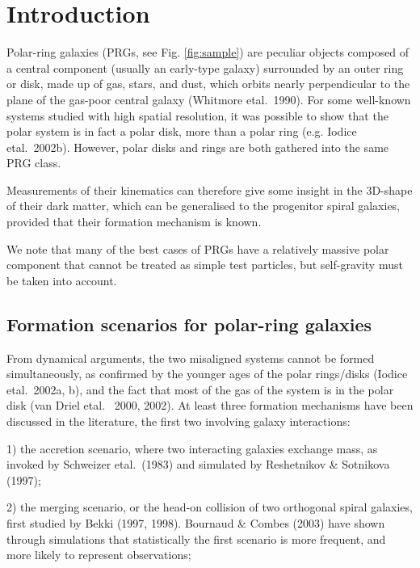 \documentclass[traditabstract]{aa}
\def\ts     {\thinspace}
\def\etal   {{\rm et\ts al.}~}
\begin{document}

\section{Introduction}

Polar-ring galaxies (PRGs, see Fig. \ref{fig:sample}) are peculiar objects composed of a
central component (usually an early-type galaxy) surrounded by
an outer ring or disk, made up of gas, stars, and dust, which
orbits nearly perpendicular to the plane of the gas-poor central
galaxy (Whitmore \etal 1990).
 For some well-known systems studied with high spatial resolution, it
was possible to show that the polar system is in fact a polar disk, more than 
a polar ring (e.g. Iodice \etal 2002b). However, polar disks and rings are 
both gathered into the same PRG class.

Measurements of their kinematics can therefore give some insight
in the 3D-shape of their dark matter, which can be generalised to
the progenitor spiral galaxies, provided that their formation mechanism is known.

We note that many of the best cases of PRGs have a relatively massive polar component
that cannot be treated as simple test particles, but self-gravity must be taken into account.


\subsection{Formation scenarios for polar-ring galaxies}

From dynamical arguments, the two misaligned systems cannot be
formed simultaneously, as confirmed by the younger ages of the
polar rings/disks (Iodice \etal 2002a, b), and the fact that most
of the gas of the system is in the polar disk (van Driel \etal
2000, 2002). At least three formation mechanisms have been
discussed in the literature, the first two involving galaxy interactions:

1) the accretion scenario, where two interacting galaxies exchange
mass, as invoked by Schweizer
\etal (1983) and simulated by Reshetnikov \& Sotnikova (1997);

2) the merging scenario, or the head-on collision of two orthogonal
spiral galaxies, first studied by Bekki (1997, 1998).
Bournaud \& Combes (2003) have shown through simulations
that statistically the first scenario is more frequent, and more likely
to represent observations;
\end{document}
